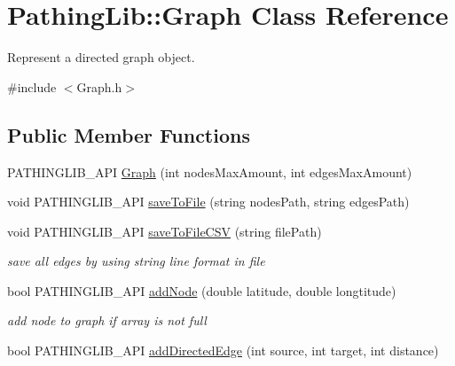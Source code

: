 \hypertarget{class_pathing_lib_1_1_graph}{}\section{Pathing\+Lib\+:\+:Graph Class Reference}
\label{class_pathing_lib_1_1_graph}


Represent a directed graph object.  




{\ttfamily \#include $<$Graph.\+h$>$}

\subsection*{Public Member Functions}
\begin{DoxyCompactItemize}
\item 
P\+A\+T\+H\+I\+N\+G\+L\+I\+B\+\_\+\+A\+PI \hyperlink{class_pathing_lib_1_1_graph_ace1d095b1f171531a169f71f988661b1}{Graph} (int nodes\+Max\+Amount, int edges\+Max\+Amount)
\item 
void P\+A\+T\+H\+I\+N\+G\+L\+I\+B\+\_\+\+A\+PI \hyperlink{class_pathing_lib_1_1_graph_a8cf200bdb165127868174c1fd4cfe279}{save\+To\+File} (string nodes\+Path, string edges\+Path)
\item 
void P\+A\+T\+H\+I\+N\+G\+L\+I\+B\+\_\+\+A\+PI \hyperlink{class_pathing_lib_1_1_graph_ac0e4b2c14f3b2b2b5058da2970c373a7}{save\+To\+File\+C\+SV} (string file\+Path)\hypertarget{class_pathing_lib_1_1_graph_ac0e4b2c14f3b2b2b5058da2970c373a7}{}\label{class_pathing_lib_1_1_graph_ac0e4b2c14f3b2b2b5058da2970c373a7}

\begin{DoxyCompactList}\small\item\em save all edges by using string line format in file \end{DoxyCompactList}\item 
bool P\+A\+T\+H\+I\+N\+G\+L\+I\+B\+\_\+\+A\+PI \hyperlink{class_pathing_lib_1_1_graph_a801e9512466a72b6aa71a33a80c90af8}{add\+Node} (double latitude, double longtitude)\hypertarget{class_pathing_lib_1_1_graph_a801e9512466a72b6aa71a33a80c90af8}{}\label{class_pathing_lib_1_1_graph_a801e9512466a72b6aa71a33a80c90af8}

\begin{DoxyCompactList}\small\item\em add node to graph if array is not full \end{DoxyCompactList}\item 
bool P\+A\+T\+H\+I\+N\+G\+L\+I\+B\+\_\+\+A\+PI \hyperlink{class_pathing_lib_1_1_graph_a99aaeeae02365630ac9cbe7bf24a9a55}{add\+Directed\+Edge} (int source, int target, int distance)\hypertarget{class_pathing_lib_1_1_graph_a99aaeeae02365630ac9cbe7bf24a9a55}{}\label{class_pathing_lib_1_1_graph_a99aaeeae02365630ac9cbe7bf24a9a55}


\end{DoxyCompactItemize}
